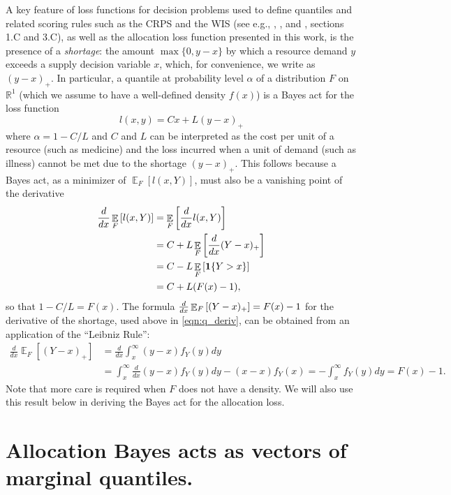 \documentclass{article}
\DeclareMathOperator{\Ex}{\mathbb{E}}
\begin{document}
A key feature of loss functions for decision problems used to define quantiles and related scoring rules such as the
CRPS and the WIS (see e.g., \cite{gneiting2011quantiles}, \cite{jose2009evaluating},
and \cite{royset2022optimization}, sections 1.C and 3.C), as well as the allocation loss function presented in this work,
is the presence of a \emph{shortage}:
the amount $\max\{0,y-x\}$ by which a resource demand
$y$ exceeds a supply decision variable $x$, which, for convenience, we write as $(y-x)_{+}$. In particular, a quantile at
probability level $\alpha$ of a distribution $F$ on $\mathbb{R}^1$ (which we assume to have a well-defined density $f(x)$)
is a Bayes act for the loss function
\[
l(x,y) = Cx + L(y-x)_{+}
\]
where $\alpha = 1-C/L$ and $C$ and $L$ can be interpreted as the cost per unit of a resource (such as medicine) and the loss
incurred when a unit of demand (such as illness) cannot be met due to the shortage $(y-x)_{+}$.  This follows because a
Bayes act, as a minimizer of $\Ex_F[l(x,Y)]$, must also be a vanishing point of the derivative
\begin{align}
\dby{}{x} \Ex_F\left[l(x,Y)\right] &= \Ex_F\left[\dby{}{x}l(x,Y)\right] \nonumber\\
&= C + L\Ex_F\left[\dby{}{x}(Y-x)_+\right] \nonumber\\
&= C - L\Ex_F\left[\mathbf{1}\{Y > x\}\right] \nonumber\\
&= C + L(F(x) - 1), \label{eqn:q_deriv}
\end{align}
so that $1-C/L = F(x)$.
The formula $\dby{}{x}\Ex_F\left[(Y-x)_+\right] = F(x) - 1$ for the derivative of the shortage,
used above in \eqref{eqn:q_deriv}, can be obtained from an application of the ``Leibniz Rule'':
\begin{align}
	\frac{d}{dx} \Ex_F [(Y-x)_{+}] &= \frac{d}{dx} \int_{x}^{\infty} (y-x) f_Y(y)dy \nonumber\\
	&= \int_{x}^{\infty} \frac{d}{dx}(y-x) f_Y(y)dy - (x-x) f_Y(x) = -\int_{x}^{\infty} f_Y(y)dy = F(x)-1. \label{eqn:shortage_deriv}
\end{align}
Note that more care is required when $F$ does not have a density.
We will also use this result below in deriving the Bayes act for the allocation loss.

\section{Allocation Bayes acts as vectors of marginal quantiles.}
\label{sec:bayes-quantiles}
\end{document}
